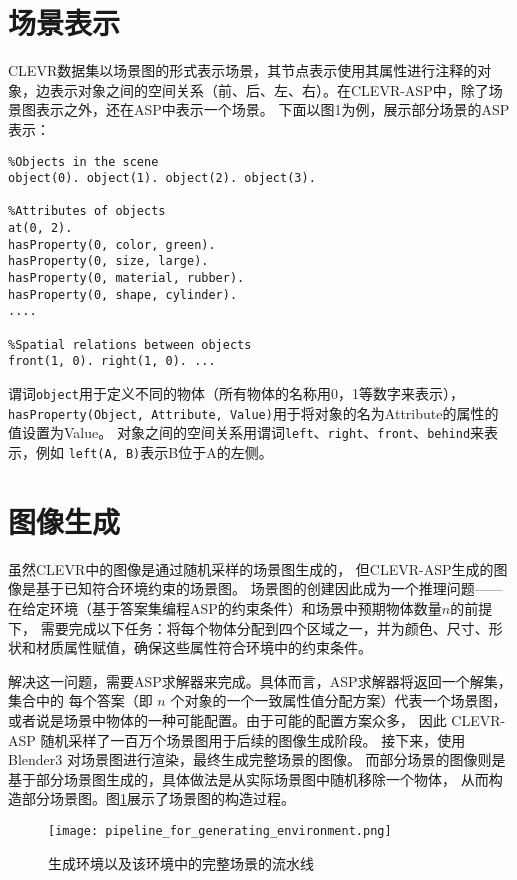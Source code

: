 \section{场景表示}
CLEVR数据集以场景图的形式表示场景，其节点表示使用其属性进行注释的对象，边表示对象之间的空间关系（前、后、左、右）。在CLEVR-ASP中，除了场景图表示之外，还在ASP中表示一个场景。
下面以图1为例，展示部分场景的ASP表示：
\begin{lstlisting}
%Objects in the scene
object(0). object(1). object(2). object(3).

%Attributes of objects
at(0, 2).
hasProperty(0, color, green).
hasProperty(0, size, large).
hasProperty(0, material, rubber).
hasProperty(0, shape, cylinder).
....

%Spatial relations between objects
front(1, 0). right(1, 0). ...
\end{lstlisting}

谓词\texttt{object}用于定义不同的物体（所有物体的名称用0，1等数字来表示），
\texttt{hasProperty(Object, Attribute, Value)}用于将对象的名为Attribute的属性的值设置为Value。
对象之间的空间关系用谓词\texttt{left}、\texttt{right}、\texttt{front}、\texttt{behind}来表示，例如
\texttt{left(A, B)}表示B位于A的左侧。

\section{图像生成}
虽然CLEVR中的图像是通过随机采样的场景图生成的，
但CLEVR-ASP生成的图像是基于已知符合环境约束的场景图。
场景图的创建因此成为一个推理问题——
在给定环境（基于答案集编程ASP的约束条件）和场景中预期物体数量$n$的前提下，
需要完成以下任务：将每个物体分配到四个区域之一，并为颜色、尺寸、形状和材质属性赋值，确保这些属性符合环境中的约束条件。

解决这一问题，需要ASP求解器来完成。具体而言，ASP求解器将返回一个解集，集合中的
每个答案（即 $n$ 个对象的一个一致属性值分配方案）代表一个场景图，
或者说是场景中物体的一种可能配置。由于可能的配置方案众多，
因此 CLEVR-ASP 随机采样了一百万个场景图用于后续的图像生成阶段。
接下来，使用 Blender3 对场景图进行渲染，最终生成完整场景的图像。
而部分场景的图像则是基于部分场景图生成的，具体做法是从实际场景图中随机移除一个物体，
从而构造部分场景图。图\ref{pipeline_for_generating_environment}展示了场景图的构造过程。
\begin{figure}
    \centering
    \texttt{[image: pipeline\_for\_generating\_environment.png]}
    \caption{生成环境以及该环境中的完整场景的流水线}
    \label{pipeline_for_generating_environment}
\end{figure}

